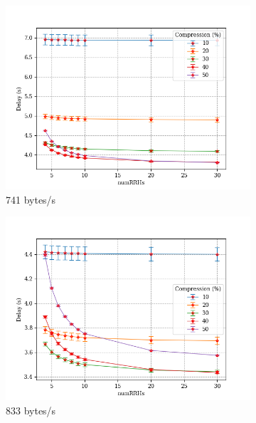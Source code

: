 \documentclass[11pt,a4paper,oneside, openright]{article}
\begin{document}
\begin{figure}[h]
\centering
\begin{subfigure}{.33\textwidth}
  \centering
  \includegraphics[width=\linewidth]{images/n-vs-delay-s-741}
  \caption{741 bytes/s}
  \label{fig:n-vs-delay-s-741}
\end{subfigure}%
\begin{subfigure}{.33\textwidth}
  \centering
  \includegraphics[width=\linewidth]{images/n-vs-delay-s-833}
  \caption{833 bytes/s}
  \label{fig:n-vs-delay-s-833}
\end{subfigure}%
\begin{subfigure}{.33\textwidth}
  \centering

\end{subfigure}
\end{figure}
\end{document}
